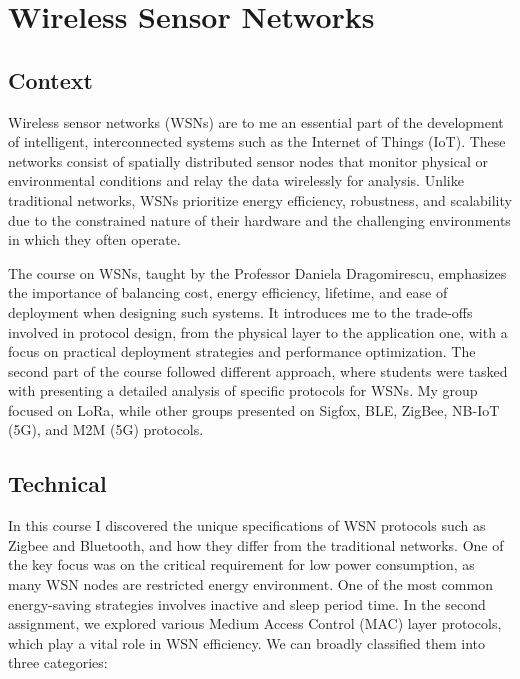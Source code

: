 \section{Wireless Sensor Networks}
\subsection{Context}
\indent \indent Wireless sensor networks (WSNs) are to me an essential part of the development of intelligent, interconnected systems such as the Internet of Things (IoT). These networks consist of spatially distributed sensor nodes that monitor physical or environmental conditions and relay the data wirelessly for analysis. Unlike traditional networks, WSNs prioritize energy efficiency, robustness, and scalability due to the constrained nature of their hardware and the challenging environments in which they often operate.

The course on WSNs, taught by the Professor Daniela Dragomirescu, emphasizes the importance of balancing cost, energy efficiency, lifetime, and ease of deployment when designing such systems. It introduces me to the trade-offs involved in protocol design, from the physical layer to the application one, with a focus on practical deployment strategies and performance optimization.
The second part of the course followed different approach, where students were tasked with presenting a detailed analysis of specific protocols for WSNs. My group focused on LoRa, while other groups presented on Sigfox, BLE, ZigBee, NB-IoT (5G), and M2M (5G) protocols.

\subsection{Technical}  

\indent \indent In this course I discovered the unique specifications of WSN protocols such as Zigbee and Bluetooth, and how they differ from the traditional networks.  One of the key focus was on the critical requirement for low power consumption, as many WSN nodes are restricted energy environment. One of the most common energy-saving strategies involves inactive and sleep period time.
\smallskip
In the second assignment, we explored various Medium Access Control (MAC) layer protocols, which play a vital role in WSN efficiency. We can  broadly classified them into three categories:


